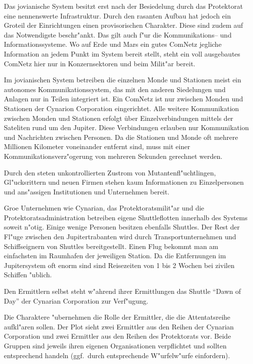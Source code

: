 
Das jovianische System besitzt erst nach der Besiedelung durch das Protektorat eine nennenswerte Infrastruktur. Durch den rasanten Aufbau hat jedoch ein Gro\3teil der Einrichtungen einen provisorischen Charakter. Diese sind zudem auf das Notwendigste beschr"ankt. Das gilt auch f"ur die Kommunikations-- und Informationssysteme. Wo auf Erde und Mars ein gutes ComNetz jegliche Information an jedem Punkt im System bereit stellt, steht ein voll ausgebautes ComNetz hier nur in Konzernsektoren und beim Milit"ar bereit.

Im jovianischen System  betreiben die einzelnen Monde und Stationen meist ein autonomes Kommunikationssystem, das mit den anderen Siedelungen und Anlagen nur in Teilen integriert ist. Ein ComNetz ist nur zwischen Monden und Stationen der Cynarion Corporation eingerichtet. Alle weitere Kommunikation zwischen Monden und Stationen erfolgt über Einzelverbindungen mittels der Sateliten rund um den Jupiter. Diese Verbindungen erlauben nur Kommunikation und Nachrichten zwischen Personen. Da die Stationen und Monde oft mehrere Millionen Kilometer voneinander entfernt sind, muss mit einer Kommunikationsverz"ogerung von mehreren Sekunden gerechnet werden.

Durch den steten unkontrollierten Zustrom von Mutantenfl"uchtlingen, Gl"ucksrittern und neuen Firmen stehen kaum Informationen zu Einzelpersonen und ans"assigen Institutionen und Unternehmen bereit.


Gro\3e Unternehmen wie Cynarian, das Protektoratsmilit"ar und die Protektoratsadministration betreiben eigene Shuttleflotten innerhalb des Systems soweit n"otig. Einige wenige Personen besitzen ebenfalls Shuttles. Der Rest der Fl"uge zwischen den Jupitertrabanten wird durch Transportunternehmen und Schiffseignern von Shuttles bereitgestellt. Einen Flug bekommt man am einfachsten im Raumhafen der jeweiligen Station. Da die Entfernungen im Jupitersystem oft enorm sind sind Reisezeiten von 1 bis 2 Wochen bei zivilen Schiffen "ublich.

Den Ermittlern selbst steht w"ahrend ihrer Ermittlungen das Shuttle "`Dawn of Day"' der Cynarian Corporation zur Verf"ugung.



Die Charaktere "ubernehmen die Rolle der Ermittler, die die Attentatsreihe aufkl"aren sollen. Der Plot sieht zwei Ermittler aus den Reihen der Cynarian Corporation und zwei Ermittler aus den Reihen des Protektorats vor. Beide Gruppen sind jeweils ihren eigenen Organisationen verpflichtet und sollten entsprechend handeln (ggf.~durch entsprechende W"urfelw"urfe einfordern).

